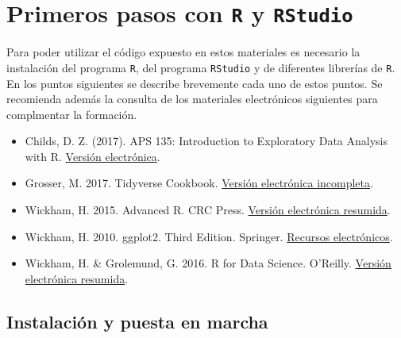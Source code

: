 \documentclass[
]{book}
\providecommand{\tightlist}{%
  \setlength{\itemsep}{0pt}\setlength{\parskip}{0pt}}
\begin{document}
\hypertarget{primeros-pasos-con-r-y-rstudio}{%
\section{\texorpdfstring{Primeros pasos con \texttt{R} y \texttt{RStudio}}{Primeros pasos con R y RStudio}}\label{primeros-pasos-con-r-y-rstudio}}

Para poder utilizar el código expuesto en estos materiales es necesario la instalación del programa \texttt{R}, del programa \texttt{RStudio} y de diferentes librerías de \texttt{R}. En los puntos siguientes se describe brevemente cada uno de estos puntos. Se recomienda además la consulta de los materiales electrónicos siguientes para complmentar la formación.

\begin{itemize}
\tightlist
\item
  Childs, D. Z. (2017). APS 135: Introduction to Exploratory Data Analysis with R. \href{https://dzchilds.github.io/eda-for-bio/}{Versión electrónica}.
\item
  Grosser, M. 2017. Tidyverse Cookbook. \href{https://bookdown.org/Tazinho/Tidyverse-Cookbook/}{Versión electrónica incompleta}.
\item
  Wickham, H. 2015. Advanced R. CRC Press. \href{https://adv-r.hadley.nz/}{Versión electrónica resumida}.
\item
  Wickham, H. 2010. ggplot2. Third Edition. Springer. \href{http://ggplot2.org/}{Recursos electrónicos}.
\item
  Wickham, H. \& Grolemund, G. 2016. R for Data Science. O'Reilly. \href{http://r4ds.had.co.nz/}{Versión electrónica resumida}.
\end{itemize}

\hypertarget{instalaciuxf3n-y-puesta-en-marcha}{%
\subsection{Instalación y puesta en marcha}\label{instalaciuxf3n-y-puesta-en-marcha}}
\end{document}
